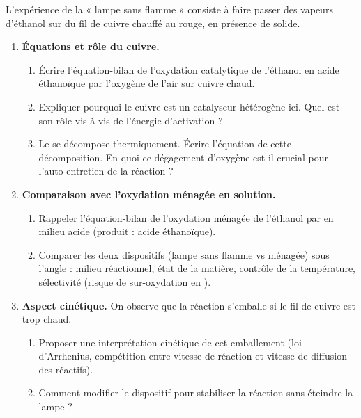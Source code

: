 \documentclass[11pt]{article}
\begin{document}
\begin{exercice}
L'expérience de la « lampe sans flamme » consiste à faire passer des vapeurs d'éthanol sur du fil de cuivre chauffé au rouge, en présence de  solide.
\begin{enumerate}
    \item \textbf{Équations et rôle du cuivre.}
    \begin{enumerate}
        \item Écrire l'équation-bilan de l'oxydation catalytique de l'éthanol en acide éthanoïque par l'oxygène de l'air sur cuivre chaud.
        \item Expliquer pourquoi le cuivre est un catalyseur hétérogène ici. Quel est son rôle vis-à-vis de l'énergie d'activation ?
        \item Le  se décompose thermiquement. Écrire l'équation de cette décomposition. En quoi ce dégagement d'oxygène est-il crucial pour l'auto-entretien de la réaction ?
    \end{enumerate}
    \item \textbf{Comparaison avec l'oxydation ménagée en solution.}
    \begin{enumerate}
        \item Rappeler l'équation-bilan de l'oxydation ménagée de l'éthanol par  en milieu acide (produit : acide éthanoïque).
        \item Comparer les deux dispositifs (lampe sans flamme vs ménagée) sous l'angle : milieu réactionnel, état de la matière, contrôle de la température, sélectivité (risque de sur-oxydation en ).
    \end{enumerate}
    \item \textbf{Aspect cinétique.} On observe que la réaction s'emballe si le fil de cuivre est trop chaud.
    \begin{enumerate}
        \item Proposer une interprétation cinétique de cet emballement (loi d'Arrhenius, compétition entre vitesse de réaction et vitesse de diffusion des réactifs).
        \item Comment modifier le dispositif pour stabiliser la réaction sans éteindre la lampe ?
    \end{enumerate}
\end{enumerate}
\end{exercice}
\end{document}
